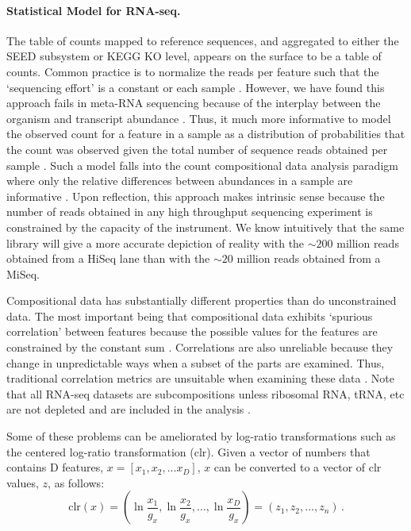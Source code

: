 \documentclass[10pt,letterpaper]{article}
\begin{document}
\paragraph{Statistical Model for RNA-seq.} The table of counts mapped to reference sequences, and aggregated to either the SEED subsystem or KEGG KO level, appears on the surface to be a table of counts. Common practice is to normalize the  reads per feature such that the `sequencing effort' is a constant or each sample \cite{Anders:2013aa}. However, we  have found this approach  fails in meta-RNA sequencing because of the interplay between the organism and transcript abundance \cite{fernandes:2013,fernandes:2014,Lovell:2015}. Thus, it much more informative to model the observed count for a feature in a sample as a distribution of probabilities that the count was observed given the total number of sequence reads obtained per sample \cite{fernandes:2013}. Such a model falls into the count compositional data analysis paradigm \cite{Aitchison:1986} where only the relative differences between abundances in a sample are informative \cite{pawlowsky2015modeling,pawlowsky2011compositional}. Upon reflection, this approach makes intrinsic sense because the number of reads obtained in any high throughput sequencing experiment is constrained by the capacity of the instrument. We know intuitively that the same library will give a more accurate depiction of reality with the $\sim 200$ million reads obtained from a HiSeq lane than with the $\sim 20$ million reads obtained from a MiSeq.

Compositional data has substantially different properties than do unconstrained data. The most important being that compositional data exhibits `spurious correlation' between features because the possible values for  the features are constrained by the constant sum \cite{pawlowsky2015modeling,pawlowsky2011compositional}. Correlations are also unreliable because they change in unpredictable ways when a subset of the parts are examined. Thus, traditional correlation metrics are unsuitable when examining these data \cite{Lovell:2015}. Note that  all RNA-seq datasets are subcompositions unless ribosomal RNA, tRNA, etc are not depleted and are included in the analysis \cite{pawlowsky2015modeling,pawlowsky2011compositional}. 

Some of these problems can be ameliorated by log-ratio transformations such as the centered log-ratio transformation (clr). Given a vector of numbers that contains D features, $x=[x_1,x_2, ... x_D]$,   $x$ can be converted to a vector of clr values, $z$, as follows: 
\begin{equation}\label{eq:clr}
\mathrm{clr}(x)=\left(\ln \frac{x_1}{g_x}, \ln\frac{x_2}{g_x}, \dots, \ln\frac{x_D}{g_x}\right)=\left(z_1,z_2, \dots, z_n \right) \,.
\end{equation}
\end{document}
